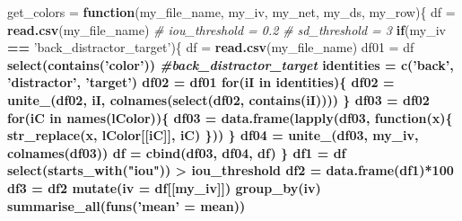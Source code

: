 \documentclass[]{article}
\newenvironment{Shaded}{\begin{snugshade}}{\end{snugshade}}
\newcommand{\KeywordTok}[1]{\textcolor[rgb]{0.13,0.29,0.53}{\textbf{#1}}}
\newcommand{\DataTypeTok}[1]{\textcolor[rgb]{0.13,0.29,0.53}{#1}}
\newcommand{\DecValTok}[1]{\textcolor[rgb]{0.00,0.00,0.81}{#1}}
\newcommand{\StringTok}[1]{\textcolor[rgb]{0.31,0.60,0.02}{#1}}
\newcommand{\CommentTok}[1]{\textcolor[rgb]{0.56,0.35,0.01}{\textit{#1}}}
\newcommand{\ControlFlowTok}[1]{\textcolor[rgb]{0.13,0.29,0.53}{\textbf{#1}}}
\newcommand{\OperatorTok}[1]{\textcolor[rgb]{0.81,0.36,0.00}{\textbf{#1}}}
\newcommand{\NormalTok}[1]{#1}
\begin{document}
\begin{Shaded}
\begin{Highlighting}[]
\NormalTok{get_colors =}\StringTok{ }\ControlFlowTok{function}\NormalTok{(my_file_name, my_iv, my_net, my_ds, my_row)\{}
\NormalTok{  df =}\StringTok{ }\KeywordTok{read.csv}\NormalTok{(my_file_name)}
  \CommentTok{# iou_threshold = 0.2}
  \CommentTok{# sd_threshold = 3}
  \ControlFlowTok{if}\NormalTok{(my_iv }\OperatorTok{==}\StringTok{ 'back_distractor_target'}\NormalTok{)\{}
\NormalTok{    df =}\StringTok{ }\KeywordTok{read.csv}\NormalTok{(my_file_name)}
\NormalTok{    df01 =}\StringTok{ }\NormalTok{df }\OperatorTok{%>%}
\StringTok{      }\KeywordTok{select}\NormalTok{(}\KeywordTok{contains}\NormalTok{(}\StringTok{'color'}\NormalTok{)) }\CommentTok{#back_distractor_target}
\NormalTok{    identities =}\StringTok{ }\KeywordTok{c}\NormalTok{(}\StringTok{'back'}\NormalTok{, }\StringTok{'distractor'}\NormalTok{, }\StringTok{'target'}\NormalTok{)}
\NormalTok{    df02 =}\StringTok{ }\NormalTok{df01}
    \ControlFlowTok{for}\NormalTok{(iI }\ControlFlowTok{in}\NormalTok{ identities)\{}
\NormalTok{      df02 =}\StringTok{ }\KeywordTok{unite_}\NormalTok{(df02, iI, }\KeywordTok{colnames}\NormalTok{(}\KeywordTok{select}\NormalTok{(df02, }\KeywordTok{contains}\NormalTok{(iI))))}
\NormalTok{    \}}
\NormalTok{    df03 =}\StringTok{ }\NormalTok{df02}
    \ControlFlowTok{for}\NormalTok{(iC }\ControlFlowTok{in} \KeywordTok{names}\NormalTok{(lColor))\{}
\NormalTok{      df03 =}\StringTok{ }\KeywordTok{data.frame}\NormalTok{(}\KeywordTok{lapply}\NormalTok{(df03, }\ControlFlowTok{function}\NormalTok{(x)\{}
      \KeywordTok{str_replace}\NormalTok{(x, lColor[[iC]], iC)}
\NormalTok{      \}))}
\NormalTok{    \}}
\NormalTok{    df04 =}\StringTok{ }\KeywordTok{unite_}\NormalTok{(df03, my_iv, }\KeywordTok{colnames}\NormalTok{(df03))}
\NormalTok{    df =}\StringTok{ }\KeywordTok{cbind}\NormalTok{(df03, df04, df) }
\NormalTok{  \}}
\NormalTok{  df1 =}\StringTok{ }\NormalTok{df }\OperatorTok{%>%}
\StringTok{    }\KeywordTok{select}\NormalTok{(}\KeywordTok{starts_with}\NormalTok{(}\StringTok{"iou"}\NormalTok{)) }\OperatorTok{>}\StringTok{ }\NormalTok{iou_threshold}
\NormalTok{  df2 =}\StringTok{ }\KeywordTok{data.frame}\NormalTok{(df1)}\OperatorTok{*}\DecValTok{100}
\NormalTok{  df3 =}\StringTok{ }\NormalTok{df2 }\OperatorTok{%>%}
\StringTok{    }\KeywordTok{mutate}\NormalTok{(}\DataTypeTok{iv =}\NormalTok{ df[[my_iv]]) }\OperatorTok{%>%}
\StringTok{    }\KeywordTok{group_by}\NormalTok{(iv) }\OperatorTok{%>%}
\StringTok{    }\KeywordTok{summarise_all}\NormalTok{(}\KeywordTok{funs}\NormalTok{(}\StringTok{'mean'}\NormalTok{ =}\StringTok{ }\NormalTok{mean))}
}}}}}
\end{Highlighting}
\end{Shaded}
\end{document}
